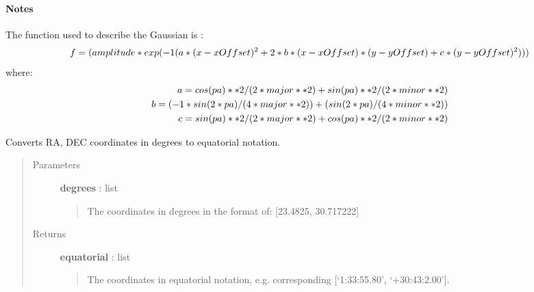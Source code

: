 \documentclass[a4paper,10pt,english]{sphinxmanual}
\begin{document}
\begin{fulllineitems}
\begin{quote}
\begin{description}
\end{description}\end{quote}
\paragraph{Notes}

The function used to describe the Gaussian is :
\begin{gather}
\begin{split}f = (amplitude * exp (-1 (a*(x-xOffset)^2 + 2*b*(x-xOffset)*(y-yOffset)
    + c*(y-yOffset)^2)))\end{split}\notag
\end{gather}
where:
\begin{gather}
\begin{split}a = cos(pa)**2/(2*major**2) + sin(pa)**2/(2*minor**2) \\
b = (-1*sin(2*pa)/(4*major**2))+(sin(2*pa)/(4*minor**2)) \\
c = sin(pa)**2/(2*major**2) + cos(pa)**2/(2*minor**2) \\\end{split}\notag
\end{gather}
\end{fulllineitems}


\begin{fulllineitems}
\label{functions:astrolyze.functions.astro_functions.degrees_to_equatorial}
Converts RA, DEC coordinates in degrees to equatorial notation.
\begin{quote}\begin{description}
\item[{Parameters }] \leavevmode
\textbf{degrees} : list
\begin{quote}

The coordinates in degrees in the format of: {[}23.4825, 30.717222{]}
\end{quote}

\item[{Returns }] \leavevmode
\textbf{equatorial} : list
\begin{quote}

The coordinates in equatorial notation, e.g.
corresponding {[}`1:33:55.80', `+30:43:2.00'{]}.
\end{quote}

\end{description}\end{quote}

\end{fulllineitems}
\end{document}
